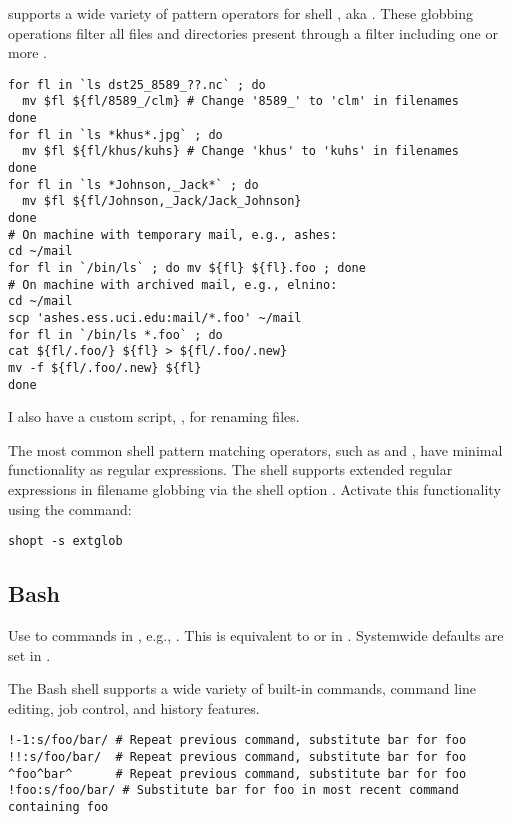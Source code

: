 \documentclass[12pt,twoside]{article}
\begin{document}
 supports a wide variety of pattern operators for 
shell , aka .
These globbing operations filter all files and directories present
through a filter including one or more .
\begin{verbatim}
for fl in `ls dst25_8589_??.nc` ; do
  mv $fl ${fl/8589_/clm} # Change '8589_' to 'clm' in filenames
done
for fl in `ls *khus*.jpg` ; do
  mv $fl ${fl/khus/kuhs} # Change 'khus' to 'kuhs' in filenames
done
for fl in `ls *Johnson,_Jack*` ; do
  mv $fl ${fl/Johnson,_Jack/Jack_Johnson}
done
# On machine with temporary mail, e.g., ashes:
cd ~/mail
for fl in `/bin/ls` ; do mv ${fl} ${fl}.foo ; done
# On machine with archived mail, e.g., elnino:
cd ~/mail
scp 'ashes.ess.uci.edu:mail/*.foo' ~/mail
for fl in `/bin/ls *.foo` ; do 
cat ${fl/.foo/} ${fl} > ${fl/.foo/.new}
mv -f ${fl/.foo/.new} ${fl}
done
\end{verbatim}
I also have a custom  script, , for
renaming files.

The most common shell pattern matching operators, such as \kbdidx{*}
and , have minimal functionality as regular expressions.
The  shell supports extended regular expressions in
filename globbing via the shell option .
Activate this functionality using the  command:
\begin{verbatim}
shopt -s extglob
\end{verbatim}

\subsection{Bash}\label{sxn:bash}
Use  to  commands in , e.g.,   
.
This is equivalent to  or  in
. 
Systemwide defaults are set in .

The Bash shell supports a wide variety of built-in commands, command
line editing, job control, and history features.
\begin{verbatim}
!-1:s/foo/bar/ # Repeat previous command, substitute bar for foo
!!:s/foo/bar/  # Repeat previous command, substitute bar for foo
^foo^bar^      # Repeat previous command, substitute bar for foo
!foo:s/foo/bar/ # Substitute bar for foo in most recent command containing foo
\end{verbatim}
\end{document}
